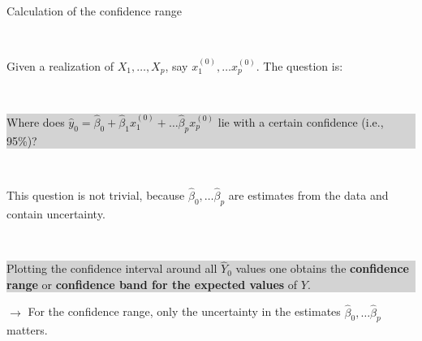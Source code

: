 \documentclass[10pt,ignorenonframetext,]{beamer}
\begin{document}
\begin{frame}

\begin{block}{Calculation of the confidence range}

\(~\)

Given a realization of \(X_1, \ldots ,X_p\), say
\(x_1^{(0)}, \ldots x_p^{(0)}\). The question is:

\(~\)

\colorbox{lightgray}{\begin{minipage}{10cm}
Where does $\hat y_0 = \hat\beta_0 + \hat\beta_1 x_1^{(0)} + \ldots \hat\beta_p x_p^{(0)}$ lie with a certain confidence (i.e., 95\%)?
\end{minipage}}

\(~\)

This question is not trivial, because
\(\hat\beta_0, \ldots \hat\beta_p\) are estimates from the data and
contain uncertainty.

\(~\)

\colorbox{lightgray}{\begin{minipage}{10cm}

Plotting the confidence interval around all $\hat Y_0$ values one obtains the {\bf confidence range} or {\bf confidence band for the expected values} of $Y$.
\end{minipage}}

\vspace{4mm}

\(\rightarrow\) For the confidence range, only the uncertainty in the
estimates \(\hat\beta_0, \ldots \hat\beta_p\) matters.

\end{block}

\end{frame}
\end{document}
